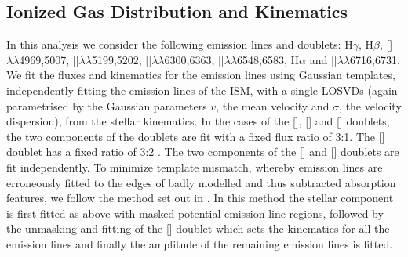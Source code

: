 \documentclass[a4paper,fleqn,usenatbib]{mnras}
\begin{document}
	\subsection{Ionized Gas Distribution and Kinematics}
		\label{subsec:EmissionLines}
		In this analysis we consider the following emission lines and doublets: H$\gamma$, H$\beta$, []$\lambda\lambda$4969,5007, []$\lambda\lambda$5199,5202, []$\lambda\lambda$6300,6363, []$\lambda\lambda$6548,6583, H$\alpha$ and []$\lambda\lambda$6716,6731. We fit the fluxes and kinematics for the emission lines using Gaussian templates, independently fitting the emission lines of the ISM, with a single LOSVDs (again parametrised by the Gaussian parameters $v$, the mean velocity and $\sigma$, the velocity dispersion), from the stellar kinematics. In the cases of the [], [] and [] doublets, the two components of the doublets are fit with a fixed flux ratio of 3:1. The [] doublet has a fixed ratio of 3:2 \citep{Safier1992}. The two components of the [] and [] doublets are fit independently. To minimize template mismatch, whereby emission lines are erroneously fitted to the edges of badly modelled and thus subtracted absorption features, we follow the method set out in \citet{Sarzi2005}. In this method the stellar component is first fitted as above with masked potential emission line regions, followed by the unmasking and fitting of the [] doublet which sets the kinematics for all the emission lines and finally the amplitude of the remaining emission lines is fitted.
\end{document}
